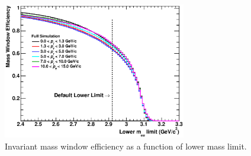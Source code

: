 \begin{figure}[!h]
  \centering
  \includegraphics[width=8cm]{chap4/figure/SignalExtraction/JpsiRawYieldMassWindowCutDep.eps}
  \caption{Invariant mass window efficiency as a function of lower mass limit. }
  \label{fig_4_masscuteff}
\end{figure}


